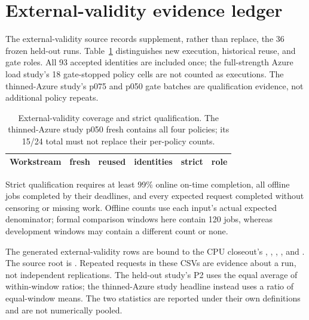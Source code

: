 \section{External-validity evidence ledger}
The external-validity source records supplement, rather than replace, the 36 frozen held-out runs.
Table~\ref{tab:coverage} distinguishes new execution, historical reuse, and gate
roles. All 93 accepted identities are included once; the full-strength Azure load study's
18 gate-stopped policy cells are not counted as executions. The thinned-Azure study's p075 and p050
gate batches are qualification evidence, not additional policy repeats.

\begin{table}[t]
\centering
\small
\caption{External-validity coverage and strict qualification. The thinned-Azure study p050 fresh contains
all four policies; its 15/24 total must not replace their per-policy counts.}
\label{tab:coverage}
\par\vspace{4pt}
\begin{tabular*}{0.92\linewidth}{@{\extracolsep{\fill}}lrrrrl@{}}
\toprule
Workstream & fresh & reused & identities & strict & role\\
\midrule

\end{tabular*}
\end{table}

Strict qualification requires at least 99\% online on-time completion,
all offline jobs completed by their deadlines, and every expected request
completed without censoring or missing work. Offline counts use each input's
actual expected denominator; formal comparison windows here contain 120 jobs,
whereas development windows may contain a different count or none.

The generated external-validity rows are bound to the CPU closeout's
, ,
, , and
. The source root is
.
Repeated requests in these CSVs are evidence about a run, not independent
replications. The held-out study's P2 uses the equal average of within-window ratios; the thinned-Azure study
headline instead uses a ratio of equal-window means. The two statistics are
reported under their own definitions and are not numerically pooled.

